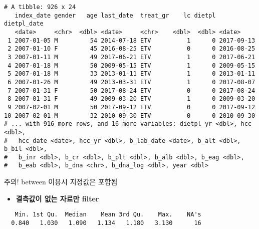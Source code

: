 \documentclass[
]{article}
\newenvironment{Shaded}{\begin{snugshade}}{\end{snugshade}}
\newcommand{\CommentTok}[1]{\textcolor[rgb]{0.56,0.35,0.01}{\textit{#1}}}
\newcommand{\FunctionTok}[1]{\textcolor[rgb]{0.00,0.00,0.00}{#1}}
\newcommand{\NormalTok}[1]{#1}
\newcommand{\SpecialCharTok}[1]{\textcolor[rgb]{0.00,0.00,0.00}{#1}}
\providecommand{\tightlist}{%
  \setlength{\itemsep}{0pt}\setlength{\parskip}{0pt}}
\begin{document}
\begin{verbatim}
# A tibble: 926 x 24
   index_date gender   age last_date  treat_gr    lc dietpl dietpl_date
   <date>     <chr>  <dbl> <date>     <chr>    <dbl>  <dbl> <date>     
 1 2007-01-05 M         54 2014-07-18 ETV          1      0 2017-09-13 
 2 2007-01-10 F         45 2016-08-25 ETV          0      0 2016-08-25 
 3 2007-01-11 M         49 2017-06-21 ETV          1      0 2017-06-21 
 4 2007-01-18 M         50 2009-05-15 ETV          1      0 2009-05-15 
 5 2007-01-18 M         33 2013-01-11 ETV          1      0 2013-01-11 
 6 2007-01-26 M         49 2013-03-31 ETV          1      0 2017-08-07 
 7 2007-01-31 F         50 2017-08-24 ETV          0      0 2017-08-24 
 8 2007-01-31 F         49 2009-03-20 ETV          1      0 2009-03-20 
 9 2007-02-01 M         50 2017-09-12 ETV          0      0 2017-09-12 
10 2007-02-01 M         32 2010-09-30 ETV          0      0 2010-09-30 
# ... with 916 more rows, and 16 more variables: dietpl_yr <dbl>, hcc <dbl>,
#   hcc_date <date>, hcc_yr <dbl>, b_lab_date <date>, b_alt <dbl>, b_bil <dbl>,
#   b_inr <dbl>, b_cr <dbl>, b_plt <dbl>, b_alb <dbl>, b_eag <dbl>,
#   b_eab <dbl>, b_dna <chr>, b_dna_log <dbl>, year <dbl>
\end{verbatim}

주의! between 이용시 지정값은 포함됨

\begin{itemize}
\tightlist
\item
  \textbf{결측값이 없는 자료만 filter}
\end{itemize}

\begin{Shaded}
\end{Shaded}

\begin{verbatim}
   Min. 1st Qu.  Median    Mean 3rd Qu.    Max.    NA's 
  0.840   1.030   1.090   1.134   1.180   3.130      16 
\end{verbatim}

\begin{Shaded}
\end{Shaded}
\end{document}
